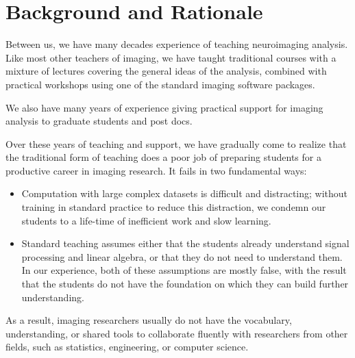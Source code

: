 
\section{Background and Rationale}\label{background}

Between us, we have many decades experience of teaching neuroimaging analysis.
Like most other teachers of imaging, we have taught traditional courses with a
mixture of lectures covering the general ideas of the analysis, combined with
practical workshops using one of the standard imaging software packages.

We also have many years of experience giving practical support for imaging
analysis to graduate students and post docs.

Over these years of teaching and support, we have gradually come to realize
that the traditional form of teaching does a poor job of preparing
students for a productive career in imaging research.  It fails in two
fundamental ways:

\begin{itemize}

\item
    Computation with large complex datasets is difficult and distracting;
        without training in standard practice to reduce this distraction, we
        condemn our students to a life-time of inefficient work and slow
        learning.

\item
    Standard teaching assumes either that the students already understand
        signal processing and linear algebra, or that they do not need to
        understand them.  In our experience, both of these assumptions are
        mostly false, with the result that the students do not have the
        foundation on which they can build further understanding.

\end{itemize}

As a result, imaging researchers usually do not have the vocabulary,
understanding, or shared tools to collaborate fluently with researchers from
other fields, such as statistics, engineering, or computer science.


